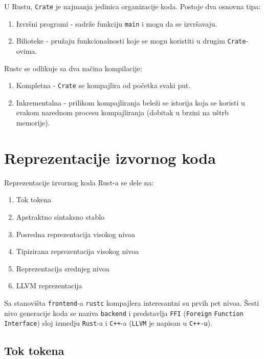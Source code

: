 \documentclass[11pt]{article}
\begin{document}
U Rustu, \verb|Crate| je najmanja jedinica organizacije koda. Postoje dva osnovna tipa:

\begin{enumerate}
    \item Izvršni programi - sadrže funkciju \verb|main| i mogu da se izvršavaju.
    \item Bilioteke - pružaju funkcionalnosti koje se mogu koristiti u drugim \verb|Crate|-ovima.
\end{enumerate} 

Rustc se odlikuje sa dva načina kompilacije: 
\begin{enumerate}
    \item Kompletna - \verb|Crate| se kompajlira od početka svaki put.
    \item Inkrementalna - prilikom kompajliranja beleži se istorija koja se koristi u svakom narednom procesu kompajliranja (dobitak u brzini na uštrb memorije).
\end{enumerate}

\section{Reprezentacije izvornog koda}

Reprezentacije izvornog koda Rust-a se dele na:

\begin{enumerate}    
    \item Tok tokena
    \item Apstraktno sintaksno stablo
    \item Posredna reprezentacija visokog nivoa
    \item Tipizirana reprezentacija visokog nivoa
    \item Reprezentacija srednjeg nivoa
    \item LLVM reprezentacija
\end{enumerate}
Sa stanovišta \verb|frontend|-a \verb|rustc| kompajlera interesantni su prvih pet nivoa. Šesti nivo generacije 
koda se naziva \verb|backend| i predstavlja \verb|FFI| (\verb|Foreign| \verb|Function| \verb|Interface|) sloj izmedju \verb|Rust|-a i \verb|C++|-a
(\verb|LLVM| je napisan u \verb|C++-u|). 

\subsection{Tok tokena}
\end{document}
